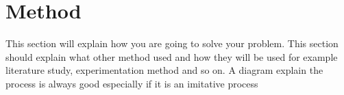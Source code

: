 


\section{Method}
This section will explain how you are going to solve your problem. This section should explain what other method used and how they will be used  for example literature study, experimentation method and so on. A diagram explain the process is always good especially if it is an imitative process
